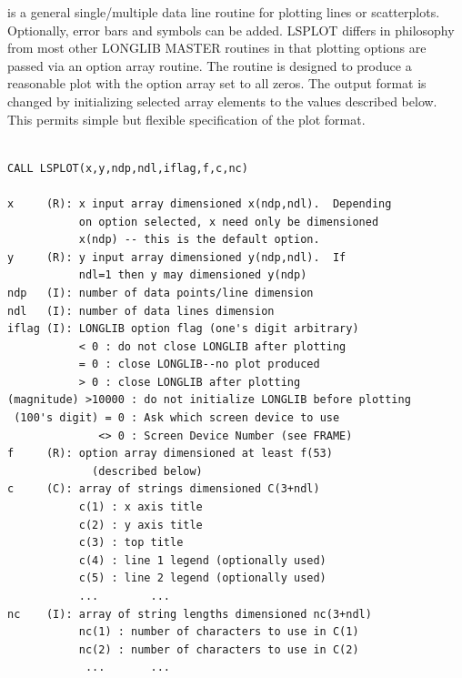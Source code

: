 \documentclass[11pt]{report}
\begin{document}
 is a general single/multiple data line routine for plotting
lines or scatterplots.  Optionally, error bars and symbols can be
added.  LSPLOT differs in philosophy from most other LONGLIB MASTER
routines in that plotting options are passed via an option array routine.
The routine is designed to produce a reasonable plot with the option
array set to all zeros.  The output format is changed by initializing
selected array elements to the values described below.
This permits simple but flexible specification of the plot format.
\begin{verbatim}

CALL LSPLOT(x,y,ndp,ndl,iflag,f,c,nc)

x     (R): x input array dimensioned x(ndp,ndl).  Depending
           on option selected, x need only be dimensioned
           x(ndp) -- this is the default option.
y     (R): y input array dimensioned y(ndp,ndl).  If
           ndl=1 then y may dimensioned y(ndp)
ndp   (I): number of data points/line dimension
ndl   (I): number of data lines dimension
iflag (I): LONGLIB option flag (one's digit arbitrary)
           < 0 : do not close LONGLIB after plotting
           = 0 : close LONGLIB--no plot produced
           > 0 : close LONGLIB after plotting
(magnitude) >10000 : do not initialize LONGLIB before plotting
 (100's digit) = 0 : Ask which screen device to use
              <> 0 : Screen Device Number (see FRAME)
f     (R): option array dimensioned at least f(53)
             (described below)
c     (C): array of strings dimensioned C(3+ndl)
           c(1) : x axis title
           c(2) : y axis title
           c(3) : top title
           c(4) : line 1 legend (optionally used)
           c(5) : line 2 legend (optionally used)
           ...        ...
nc    (I): array of string lengths dimensioned nc(3+ndl)
           nc(1) : number of characters to use in C(1)
           nc(2) : number of characters to use in C(2)
            ...       ...
\end{verbatim}
\end{document}
